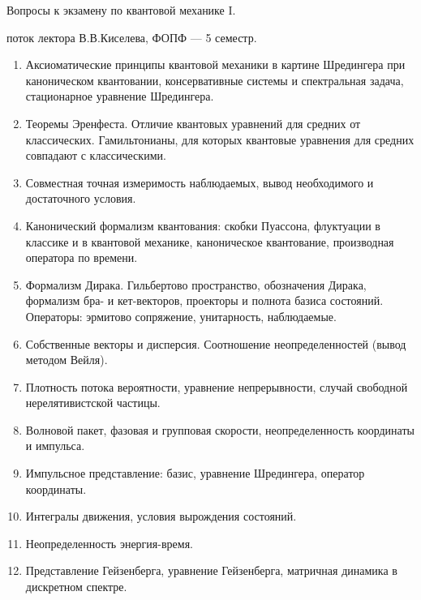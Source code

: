 \begin{center}
	\huge Вопросы к экзамену по квантовой механике I.
\end{center}
\begin{flushright}
	\large поток лектора В.В.Киселева, ФОПФ — 5 семестр.
\end{flushright}
\hline
\begin{enumerate}
\item Аксиоматические принципы квантовой механики в картине Шредингера
при каноническом квантовании, консервативные системы и спектральная задача, стационарное уравнение Шредингера.

\item Теоремы Эренфеста. Отличие квантовых уравнений для средних от
классических. Гамильтонианы, для которых квантовые уравнения для
средних совпадают с классическими.

\item Совместная точная измеримость наблюдаемых, вывод необходимого и
достаточного условия.

\item Канонический формализм квантования: скобки Пуассона, флуктуации
в классике и в квантовой механике, каноническое квантование, производная оператора по времени.

\item Формализм Дирака. Гильбертово пространство, обозначения Дирака,
формализм бра- и кет-векторов, проекторы и полнота базиса состояний.
Операторы: эрмитово сопряжение, унитарность, наблюдаемые.

\item Собственные векторы и дисперсия. Соотношение неопределенностей
(вывод методом Вейля).

\item Плотность потока вероятности, уравнение непрерывности, случай свободной нерелятивистской частицы.

\item Волновой пакет, фазовая и групповая скорости, неопределенность координаты и импульса.

\item Импульсное представление: базис, уравнение Шредингера, оператор координаты.

\item Интегралы движения, условия вырождения состояний.

\item Неопределенность энергия-время.

\item Представление Гейзенберга, уравнение Гейзенберга, матричная динамика в дискретном спектре.


\end{enumerate}

